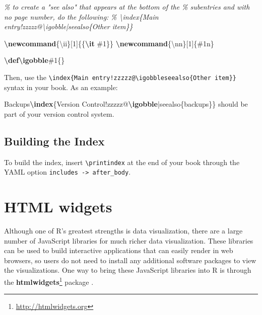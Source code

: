\documentclass[
  12pt,
]{krantz}
\newenvironment{Shaded}{\begin{snugshade}}{\end{snugshade}}
\newcommand{\CommentTok}[1]{\textcolor[rgb]{0.56,0.35,0.01}{\textit{#1}}}
\newcommand{\ExtensionTok}[1]{#1}
\newcommand{\FunctionTok}[1]{\textcolor[rgb]{0.13,0.29,0.53}{\textbf{#1}}}
\newcommand{\NormalTok}[1]{#1}
\renewcommand{\href}[2]{#2\footnote{\url{#1}}}
\theoremstyle{definition}
\theoremstyle{definition}
\theoremstyle{definition}
\theoremstyle{definition}
\theoremstyle{remark}
\begin{document}
\begin{Shaded}
\begin{Highlighting}[]
\CommentTok{\% to create a "see also" that appears at the bottom of the}
\CommentTok{\% subentries and with no page number, do the following:}
\CommentTok{\% \textbackslash{}index\{Main entry!zzzzz@\textbackslash{}igobble|seealso\{Other item\}\}}

\FunctionTok{\textbackslash{}newcommand}\NormalTok{\{}\ExtensionTok{\textbackslash{}ii}\NormalTok{\}[1]\{\{}\FunctionTok{\textbackslash{}it}\NormalTok{ \#1\}\}}
\FunctionTok{\textbackslash{}newcommand}\NormalTok{\{}\ExtensionTok{\textbackslash{}nn}\NormalTok{\}[1]\{\#1n\}}

\FunctionTok{\textbackslash{}def\textbackslash{}igobble}\NormalTok{\#1\{\}}
\end{Highlighting}
\end{Shaded}

Then, use the \texttt{\textbackslash{}index\{Main\ entry!zzzzz@\textbackslash{}igobble\textbar{}seealso\{Other\ item\}\}} syntax in your book. As an example:

\begin{Shaded}
\begin{Highlighting}[]
\NormalTok{Backups}\FunctionTok{\textbackslash{}index}\NormalTok{\{Version Control!zzzzz@}\FunctionTok{\textbackslash{}igobble}\NormalTok{|seealso\{backups\}\}}
\NormalTok{should be part of your version control system.}
\end{Highlighting}
\end{Shaded}

\subsection{Building the Index}\label{building-the-index}

To build the index, insert \texttt{\textbackslash{}printindex} at the end of your book through the YAML option \texttt{includes\ -\textgreater{}\ after\_body}.

\section{HTML widgets}\label{html-widgets}

Although one of R's greatest strengths is data visualization, there are a large number of JavaScript libraries for much richer data visualization. These libraries can be used to build interactive applications that can easily render in web browsers, so users do not need to install any additional software packages to view the visualizations. One way to bring these JavaScript libraries into R is through the \href{http://htmlwidgets.org}{\textbf{htmlwidgets}} package \citep{R-htmlwidgets}.
\end{document}
